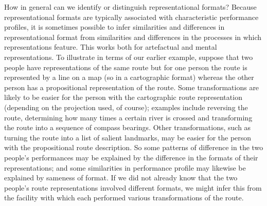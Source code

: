 \documentclass[12pt,\papersize]{extarticle}
\begin{document}
How in general can we identify or distinguish representational formats? Because representational formats are typically associated with characteristic performance profiles, it is sometimes possible to infer similarities and differences in representational format from similarities and differences in the processes in which representations feature. This works both for artefactual and mental representations.  To illustrate in terms of our earlier example, suppose that two people have representations of the same route but for one person the route is represented by a line on a map (so in a cartographic format) whereas the other person has a propositional representation of the route. Some transformations are likely to be easier for the person with the cartographic route representation (depending on the projection used, of course); examples include reversing the route, determining how many times a certain river is crossed and transforming the route into a sequence of compass bearings. Other transformations, such as turning the route into a list of salient landmarks, may be easier for the person with the propositional route description. So some patterns of difference in the two people's performances may be explained by the difference in the formats of their representations; and some similarities in performance profile may likewise be explained by sameness of format. If we did not already know that the two people's route representations involved different formats, we might infer this from the facility with which each performed various transformations of the route.
\end{document}
